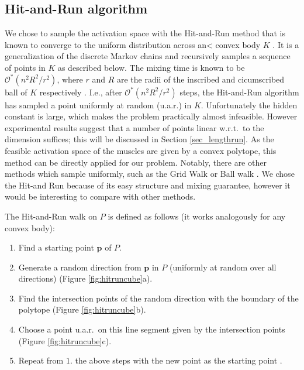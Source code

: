 \subsection{Hit-and-Run algorithm}
\label{ss:hitrun}
We chose to sample the activation space with the Hit-and-Run method that is known to converge to the uniform distribution across an< convex body $K$ \cite{smith1984efficient}. It is a generalization of the discrete Markov chains and recursively samples a sequence of points in $K$ as described below. The mixing time is known to be $\mathcal{O}^*(n^2R^2/r^2)$, where $r$ and $R$ are the radii of the inscribed and cicumscribed ball of $K$ respectively \cite{Dyer, Lovasz}. I.e., after $\mathcal{O}^*(n^2R^2/r^2)$ steps, the Hit-and-Run algorithm has sampled a point uniformly at random (u.a.r.) in $K$. Unfortunately the hidden constant is large, which makes the problem practically almost infeasible. However experimental results suggest that a number of points linear w.r.t.\ to the dimension suffices; this will be discussed in Section \ref{sec_lengthrun}.
As the feasible activation space of the muscles are given by a convex polytope, this method can be directly applied for our problem. Notably, there are other methods which sample uniformly, such as the Grid Walk or Ball walk \cite{Vempala}. We chose the Hit-and Run because of its easy structure and mixing guarantee, however it would be interesting to compare with other methods.

The Hit-and-Run walk on $P$ is defined as follows (it works analogously for any convex body):
\begin{enumerate}
\item Find a starting point $\textbf{p}$ of $P$. %
\item Generate a random direction from $\textbf{p}$ in $P$ (uniformly at random over all directions) (Figure \ref{fig:hitruncube}a).
\item Find the intersection points of the random direction with the boundary of the polytope (Figure \ref{fig:hitruncube}b).
\item Choose a point u.a.r.\ on this line segment given by the intersection points (Figure \ref{fig:hitruncube}c). 
\item Repeat from $1.$ the above steps with the new point as the starting point .
\end{enumerate}

